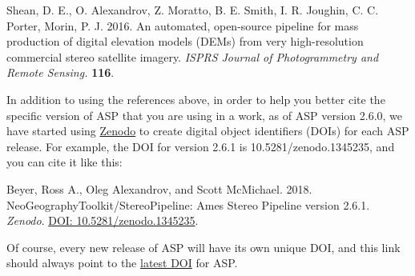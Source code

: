 \begin{description}
\item Shean, D. E., O. Alexandrov, Z. Moratto, B. E. Smith, I. R. Joughin, C. C. Porter, Morin, P. J. 2016.  An automated, open-source pipeline for mass production of digital elevation models (DEMs) from very high-resolution commercial stereo satellite imagery. 
\textit{ISPRS Journal of Photogrammetry and Remote Sensing.} 
\textbf{116}.
\end{description}

% 
% 

In addition to using the references above, in order to help you
better cite the specific version of ASP that you are using in a work, as of ASP version 2.6.0,
we have started using \href{https://zenodo.org}{Zenodo} to create digital object identifiers (DOIs)
for each ASP release.  For example, the DOI for version 2.6.1 is 10.5281/zenodo.1345235, and you can
cite it like this:

\begin{description}
\item Beyer, Ross A., Oleg Alexandrov, and Scott McMichael. 2018. NeoGeographyToolkit/StereoPipeline: Ames Stereo Pipeline version 2.6.1. \textit{Zenodo}. \href{http://doi.org/10.5281/zenodo.1345235}{DOI: 10.5281/zenodo.1345235}.
\end{description}

Of course, every new release of ASP will have its own unique DOI,
and this link should always point to the
\href{https://zenodo.org/badge/latestdoi/714891}{latest DOI} for
ASP.

